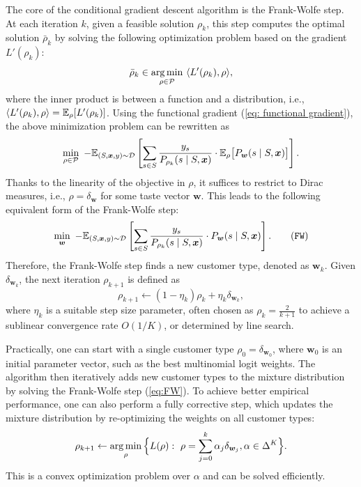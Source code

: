 \documentclass{article} %
\begin{document}
The core of the conditional gradient descent algorithm is the Frank-Wolfe step. At each iteration $k$, given a feasible solution $\rho_k$, this step computes the optimal solution $\bar{\rho}_k$ by solving the following optimization problem based on the gradient $L'(\rho_k)$:
$$
  \bar{\rho}_k \in \operatorname*{arg\,min}_{\rho\in\mathcal{P}}\ \langle L'(\rho_k), \rho \rangle,
$$
where the inner product is between a function and a distribution, i.e., $\langle L'(\rho_k), \rho \rangle = \mathbb{E}_{\rho}[L'(\rho_k)]$. 
Using the functional gradient (\ref{eq: functional gradient}), the above minimization problem can be rewritten as
$$
  \min_{\rho \in \mathcal{P}}\ -\E_{(S,\boldsymbol{x},y)\sim\mathcal{D}}\left[ \sum_{s\in S} \frac{y_s}{P_{\rho_k}(s\mid S,\boldsymbol{x})} \cdot \E_{\rho}\big[P_{\boldsymbol{w}}(s\mid S,\boldsymbol{x})\big] \right].   
$$
Thanks to the linearity of the objective in $\rho$, it suffices to restrict to Dirac measures, i.e., $\rho = \delta_{\boldsymbol{w}}$ for some taste vector $\boldsymbol{w}$. This leads to the following equivalent form of the Frank-Wolfe step:
\begin{align}\label{eq:FW}
  \min_{\boldsymbol{w}}\ -\E_{(S,\boldsymbol{x},y)\sim\mathcal{D}}\left[ \sum_{s\in S} \frac{y_s}{P_{\rho_k}(s\mid S,\boldsymbol{x})} \cdot P_{\boldsymbol{w}}(s\mid S,\boldsymbol{x}) \right].
  \tag{\texttt{FW}}
\end{align}
Therefore, the Frank-Wolfe step finds a new customer type, denoted as $\boldsymbol{w}_{k}$. Given $\delta_{\boldsymbol{w}_{k}}$, the next iteration $\rho_{k+1}$ is defined as
\[
  \rho_{k+1} \gets (1-\eta_k) \rho_k + \eta_k \delta_{\boldsymbol{w}_{k}},
\]
where $\eta_k$ is a suitable step size parameter, often chosen as $\rho_k = \frac{2}{k+1}$ to achieve a sublinear convergence rate $O(1/K)$, or determined by line search.

Practically, one can start with a single customer type $\rho_0 = \delta_{\boldsymbol{w}_0}$, where $\boldsymbol{w}_0$ is an initial parameter vector, such as the best multinomial logit weights. The algorithm then iteratively adds new customer types to the mixture distribution by solving the Frank-Wolfe step (\ref{eq:FW}). To achieve better empirical performance, one can also perform a fully corrective step, which updates the mixture distribution by re-optimizing the weights on all customer types:
\[
  \rho_{k+1} \gets \argmin_{\rho} \Big\{ L(\rho): \ \rho = \sum_{j=0}^k \alpha_j \delta_{\boldsymbol{w}_j}, \alpha \in \Delta^K \Big\}.
\]
This is a convex optimization problem over $\alpha$ and can be solved efficiently.
\end{document}
